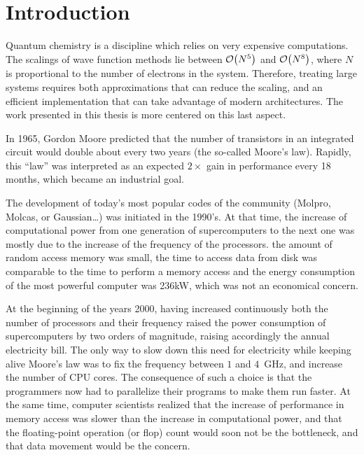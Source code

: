 \documentclass[12pt,a4paper]{report}
\begin{document}



\chapter{Introduction}


Quantum chemistry is a discipline which relies on very expensive computations.
The scalings of wave function methods lie between $\order{N^5}$ and
$\order{N^8}$, where $N$ is proportional to the number of electrons in the
system. Therefore, treating large systems requires both approximations that can
reduce the scaling, and an efficient implementation that can take advantage of
modern architectures. The work presented in this thesis is more centered on
this last aspect. 

In 1965, Gordon Moore predicted that the number of transistors in an integrated
circuit would double about every two years (the so-called Moore's
law).\cite{Moore}  Rapidly, this ``law'' was interpreted as an expected
$2\times$ gain in performance every 18 months, which became an industrial goal.

The development of today's most popular codes of the community
(Molpro\cite{Molpro}, Molcas\cite{Molcas}, or Gaussian\cite{g09}\dots) was
initiated in the 1990's.  At that time, the increase of computational power
from one generation of supercomputers to the next one was mostly due to the
increase of the frequency of the processors. the amount of random access memory
was small, the time to access data from disk was comparable to the time to
perform a memory access and the energy consumption of the most powerful
computer was 236kW, which was not an economical concern.\cite{top500_93}

At the beginning of the years 2000, having increased continuously both the number
of processors and their frequency raised the power consumption of
supercomputers by two orders of magnitude, raising accordingly the annual
electricity bill.  The only way to slow down this need for electricity while
keeping alive Moore's law was to fix the frequency between $1$ and
$4$~GHz, and increase the number of CPU cores.  The consequence of such a
choice is that the programmers now had to parallelize their programs to make them
run faster.  At the same time, computer scientists realized that the increase
of performance in memory access was slower than the increase in computational
power,\cite{Wulf1995Mar} and that the floating-point operation (or flop) count
would soon not be the bottleneck, and that data movement would be the concern. 
\end{document}
